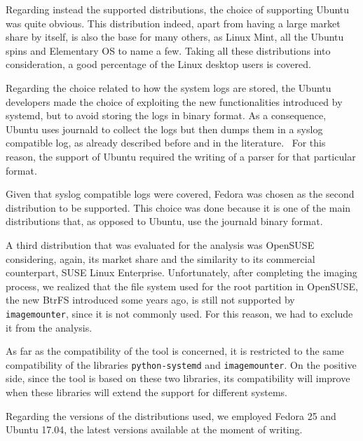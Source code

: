 \documentclass[a4paper,twocolumn]{article}
\begin{document}
Regarding instead the supported distributions, the choice of supporting Ubuntu
was quite obvious. This distribution indeed, apart from having a large market
share by itself, is also the base for many others, as Linux Mint, all the Ubuntu
spins and Elementary OS to name a few. Taking all these distributions into
consideration, a good percentage of the Linux desktop users is covered.

Regarding the choice related to how the system logs are stored, the Ubuntu
developers made the choice of exploiting the new functionalities introduced by
systemd, but to avoid storing the logs in binary format. As a consequence,
Ubuntu uses journald to collect the logs but then dumps them in a syslog
compatible log, as already described before and in the
literature.~\cite{patil2016digital} For this reason, the support of Ubuntu
required the writing of a parser for that particular format.

Given that syslog compatible logs were covered, Fedora was chosen as the second
distribution to be supported. This choice was done because it is one of the main
distributions that, as opposed to Ubuntu, use the journald binary format.

A third distribution that was evaluated for the analysis was OpenSUSE
considering, again, its market share and the similarity to its commercial
counterpart, SUSE Linux Enterprise. Unfortunately, after completing the imaging
process, we realized that the file system used for the root partition in
OpenSUSE, the new BtrFS introduced some years ago, is still not supported by
\texttt{imagemounter}, since it is not commonly used. For this reason, we had to
exclude it from the analysis.

As far as the compatibility of the tool is concerned, it is restricted to the
same compatibility of the libraries \texttt{python-systemd} and
\texttt{imagemounter}. On the positive side, since the tool is based on these two
libraries, its compatibility will improve when these libraries will extend
the support for different systems.

Regarding the versions of the distributions used, we employed Fedora 25 and
Ubuntu 17.04, the latest versions available at the moment of writing.
\end{document}
